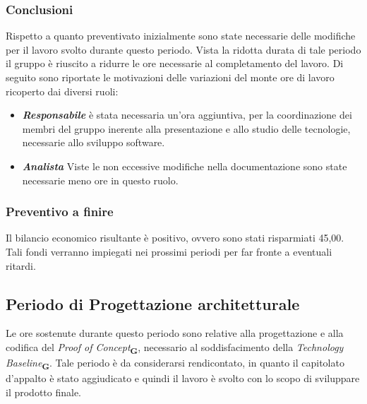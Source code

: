 \subsubsection{Conclusioni}
Rispetto a quanto preventivato inizialmente sono state necessarie delle modifiche per il lavoro svolto durante questo periodo. Vista la ridotta durata di tale periodo il gruppo è riuscito a ridurre le ore necessarie al completamento del lavoro. Di seguito sono riportate le motivazioni delle variazioni del monte ore di lavoro ricoperto dai diversi ruoli:
\begin{itemize}
    \item \textbf{\textit{Responsabile}} è stata necessaria un'ora aggiuntiva, per la coordinazione dei membri del gruppo inerente alla presentazione e allo studio delle tecnologie, necessarie allo sviluppo software.
    \item \textbf{\textit{Analista}} Viste le non eccessive modifiche nella documentazione sono state necessarie meno ore in questo ruolo.
\end{itemize}

\subsubsection{Preventivo a finire} Il bilancio economico risultante è positivo, ovvero sono stati risparmiati 45,00\EURdig. Tali fondi verranno impiegati nei prossimi periodi per far fronte a eventuali ritardi.

\newpage
\subsection{Periodo di Progettazione architetturale}
Le ore sostenute durante questo periodo sono relative alla progettazione e alla codifica del \textit{Proof of Concept}\textsubscript{\textbf{G}}, necessario al soddisfacimento della \textit{Technology Baseline}\textsubscript{\textbf{G}}. Tale periodo è da considerarsi rendicontato, in quanto il capitolato d'appalto è stato aggiudicato e quindi il lavoro è svolto con lo scopo di sviluppare il prodotto finale.

